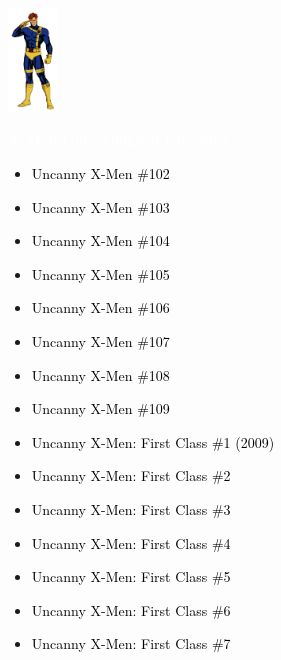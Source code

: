\documentclass[12pt]{article}
\newcommand{\checkbox}{\raisebox{0.0ex}{\fbox{\rule{0ex}{1.5ex} \rule{1.5ex}{0ex}}}}
\begin{document}
\begin{center}
    \vspace*{2cm}
    \includegraphics[width=0.1\textwidth]{cyclops.png}
    \vspace{0.3cm}

    {\Huge \textbf{\textcolor{white}{X-Men Chronological Checklist}}}
\end{center}

\vspace{0.3cm}
\noindent
\begin{tcolorbox}[
  colback=white!95!gray,
  colframe=black,
  width=\textwidth,
  arc=4mm,
  auto outer arc,
  boxrule=0.8pt,
  left=8pt,right=8pt,top=8pt,bottom=8pt
]
\begin{itemize}[left=0pt,label={\checkbox}]
  \item \textcolor{black}{Uncanny X-Men \#102}
  \item \textcolor{black}{Uncanny X-Men \#103}
  \item \textcolor{black}{Uncanny X-Men \#104}
  \item \textcolor{black}{Uncanny X-Men \#105}
  \item \textcolor{black}{Uncanny X-Men \#106}
  \item \textcolor{black}{Uncanny X-Men \#107}
  \item \textcolor{black}{Uncanny X-Men \#108}
  \item \textcolor{black}{Uncanny X-Men \#109}
  \item \textcolor{black}{Uncanny X-Men: First Class \#1 (2009)}
  \item \textcolor{black}{Uncanny X-Men: First Class \#2}
  \item \textcolor{black}{Uncanny X-Men: First Class \#3}
  \item \textcolor{black}{Uncanny X-Men: First Class \#4}
  \item \textcolor{black}{Uncanny X-Men: First Class \#5}
  \item \textcolor{black}{Uncanny X-Men: First Class \#6}
  \item \textcolor{black}{Uncanny X-Men: First Class \#7}
\end{itemize}
\end{tcolorbox}
\end{document}
